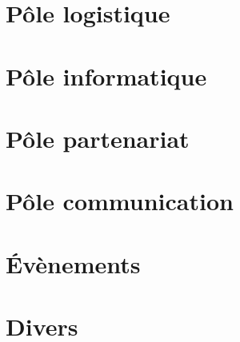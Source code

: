 \documentclass{article} %
\begin{document}
	\section{Pôle logistique}
	\section{Pôle informatique}
	\section{Pôle partenariat}
	\section{Pôle communication}
	\section{Évènements}
	\section{Divers}
\end{document}
